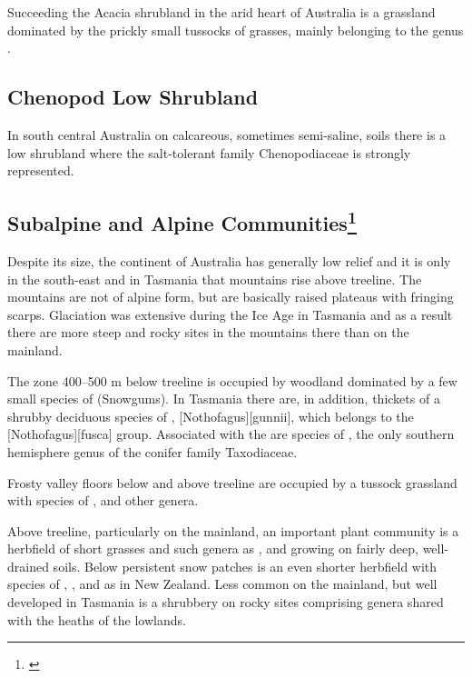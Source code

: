 Succeeding the Acacia shrubland in the arid heart of Australia is a grassland dominated by the prickly small tussocks of grasses, mainly belonging to the genus .

\subsection{Chenopod Low Shrubland}

In south central Australia on calcareous, sometimes semi-saline, soils there is a low shrubland where the salt-tolerant family Chenopodiaceae is strongly represented.

\subsection[Subalpine and Alpine Communities]{Subalpine and Alpine Communities\footnote{\cite{harris1970alpine}}}

Despite its size, the continent of Australia has generally low relief and it is only in the south-east and in Tasmania that mountains rise above treeline.
The mountains are not of alpine form, but are basically raised plateaus with fringing scarps.
Glaciation was extensive during the Ice Age in Tasmania and as a result there are more steep and rocky sites in the mountains there than on the mainland.

The zone 400–500 m below treeline is occupied by woodland dominated by a few small species of  (Snowgums).
In Tasmania there are, in addition, thickets of a shrubby deciduous species of , [Nothofagus][gunnii], which belongs to the [Nothofagus][fusca] group.
Associated with the  are species of , the only southern hemisphere genus of the conifer family Taxodiaceae.

Frosty valley floors below and above treeline are occupied by a tussock grassland with species of ,  and other genera.

Above treeline, particularly on the mainland, an important plant community is a herbfield of short grasses and such genera as ,  and  growing on fairly deep, well-drained soils.
Below persistent snow patches is an even shorter herbfield with species of , ,  and  as in New Zealand.
Less common on the mainland, but well developed in Tasmania is a shrubbery on rocky sites comprising genera shared with the heaths of the lowlands.

